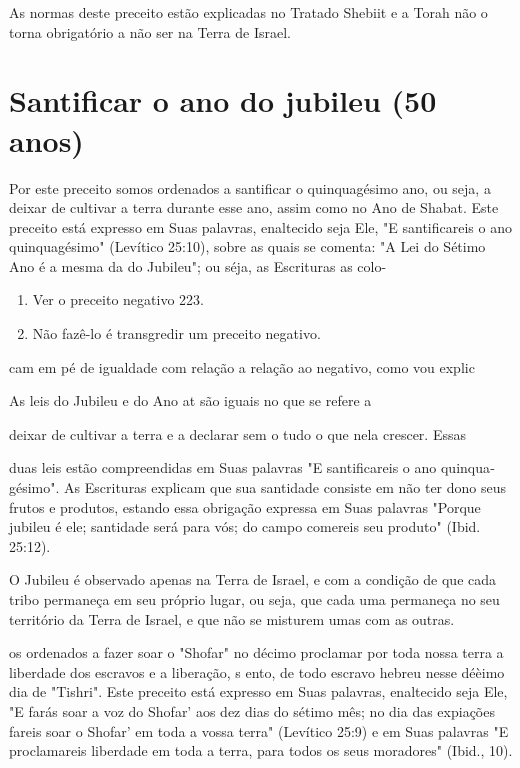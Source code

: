 \begin{itemize}
\begin{enumrate}
\begin{itemize}
\begin{itemize}
\begin{itemize}
As normas deste preceito estão explicadas no Tratado Shebiit e a To­rah
não o torna obrigatório a não ser na Terra de Israel.

\section{Santificar o ano do jubileu (50 anos)}

Por este preceito somos ordenados a santificar o quinquagésimo ano, ou
seja, a deixar de cultivar a terra durante esse ano, assim como no Ano
de Shabat. Este preceito está expresso em Suas palavras, enaltecido seja
Ele, "E santificareis o ano quinquagésimo" (Levítico 25:10), sobre as
quais se comen­ta: "A Lei do Sétimo Ano é a mesma da do Jubileu"; ou
séja, as Escrituras as colo-


\begin{enumerate}
\def\labelenumi{\arabic{enumi}.}
\setcounter{enumi}{170}
\item
 
 Ver o preceito negativo 223.
 
\item
 
 Não fazê-lo é transgredir um preceito negativo.
 
\end{enumerate}




cam em pé de igualdade com relação a relação ao negativo, como vou
explic

As leis do Jubileu e do Ano at são iguais no que se refere a

deixar de cultivar a terra e a declarar sem o tudo o que nela crescer.
Essas

duas leis estão compreendidas em Suas palavras "E santificareis o ano
quinqua­gésimo". As Escrituras explicam que sua santidade consiste em
não ter dono seus frutos e produtos, estando essa obrigação expressa em
Suas palavras "Por­que jubileu é ele; santidade será para vós; do campo
comereis seu produto" (Ibid. 25:12).

O Jubileu é observado apenas na Terra de Israel, e com a condição de que
cada tribo permaneça em seu próprio lugar, ou seja, que cada uma
per­maneça no seu território da Terra de Israel, e que não se misturem
umas com as outras.

os ordenados a fazer soar o "Shofar" no décimo proclamar por toda nossa
terra a liberdade dos escravos e a liberação, s ento, de todo escravo
hebreu nesse déèimo dia de "Tishri". Este preceito está expresso em Suas
palavras, enaltecido seja Ele, "E farás soar a voz do Shofar' aos dez
dias do sétimo mês; no dia das expiações fa­reis soar o Shofar' em toda
a vossa terra" (Levítico 25:9) e em Suas palavras "E proclamareis
liberdade em toda a terra, para todos os seus moradores" (Ibid., 10).


\end{itemize}
\end{itemize}
\end{itemize}
\end{enumrate}
\end{itemize}
